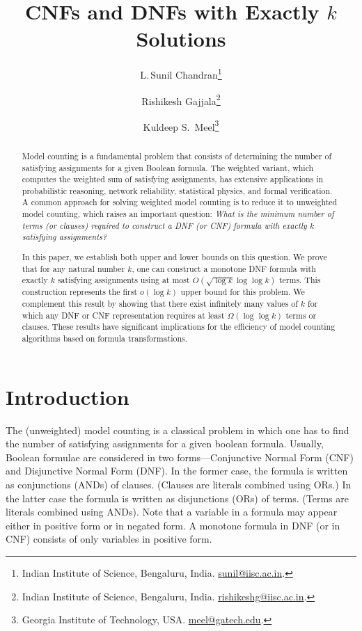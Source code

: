 \documentclass[11pt,a4paper]{article}
\title{CNFs and DNFs with Exactly $k$ Solutions}
\author{%
  L.\,Sunil Chandran\thanks{Indian Institute of Science, Bengaluru, India.
  \href{mailto:sunil@iisc.ac.in}{sunil@iisc.ac.in}.}
  \and
  Rishikesh Gajjala\thanks{Indian Institute of Science, Bengaluru, India.
  \href{mailto:rishikeshg@iisc.ac.in}{rishikeshg@iisc.ac.in}.}
  \and
  Kuldeep S.\ Meel\thanks{Georgia Institute of Technology, USA.
  \href{mailto:meel@gatech.edu}{meel@gatech.edu}.}
}
\date{ }
\theoremstyle{definition}
\begin{document}
\maketitle


%
\begin{abstract}
	Model counting is a fundamental problem that consists of determining the 
	number of satisfying assignments for a given Boolean formula. The weighted variant, which computes the weighted sum of satisfying 
	assignments, has extensive applications in probabilistic reasoning, 
	network reliability, statistical physics, and formal verification. A 
	common approach for solving weighted model counting is to reduce it to 
	unweighted model counting, which raises an important question: {\em What is 
	the minimum number of terms (or clauses) required to construct a DNF 
	(or CNF) formula with exactly $k$ satisfying assignments?}
	
	In this paper, we establish both upper and lower bounds on this 
	question. We prove that for any natural number $k$, one can construct a 
	monotone DNF formula with exactly $k$ satisfying assignments using at 
	most $O(\sqrt{\log k}\log\log k)$ terms. This construction represents 
	the first $o(\log k)$ upper bound for this problem. We complement this 
	result by showing that there exist infinitely many values of $k$ for 
	which any DNF or CNF representation requires at least $\Omega(\log\log 
	k)$ terms or clauses. These results have significant implications for 
	the efficiency of model counting algorithms based on formula 
	transformations.
\end{abstract}
%

%
%
\section{Introduction}
\label{sec:introduction}

The (unweighted) model counting is a classical problem in which one has 
to find the number of satisfying assignments for a given boolean 
formula. Usually, Boolean formulae are considered in two forms---Conjunctive Normal Form (CNF) and Disjunctive Normal Form (DNF). In 
the former case, the formula is written as conjunctions (ANDs) of 
clauses. (Clauses are literals combined using ORs.) In the latter case 
the formula is written as disjunctions (ORs) of terms. (Terms are 
literals combined using ANDs). Note that a variable in a formula may 
appear either in positive form or in negated form. A monotone formula 
in DNF (or in CNF) consists of only variables in positive form.
\end{document}
